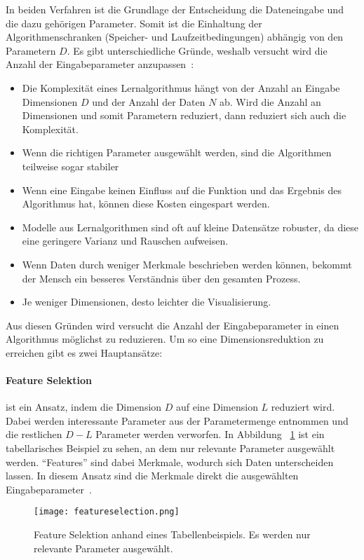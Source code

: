 In beiden Verfahren ist die Grundlage der Entscheidung die Dateneingabe und die dazu gehörigen Parameter. Somit ist die Einhaltung der Algorithmenschranken (Speicher- und Laufzeitbedingungen) abhängig von den Parametern $D$. Es gibt unterschiedliche Gründe, weshalb versucht wird die Anzahl der Eingabeparameter anzupassen~\cite{alpaydin2014introduction}:
\begin{itemize}
  \setlength{\itemsep}{3pt}
  \renewcommand\labelitemi{\textbullet}
  \item Die Komplexität eines Lernalgorithmus hängt von der Anzahl an Eingabe Dimensionen $D$ und der Anzahl der Daten $N$ ab. Wird die Anzahl an Dimensionen und somit Parametern reduziert, dann reduziert sich auch die Komplexität.
  \item Wenn die richtigen Parameter ausgewählt werden, sind die Algorithmen teilweise sogar stabiler~\cite{morchen2003time}
  \item Wenn eine Eingabe keinen Einfluss auf die Funktion und das Ergebnis des Algorithmus hat, können diese Kosten eingespart werden.
  \item Modelle aus Lernalgorithmen sind oft auf kleine Datensätze robuster, da diese eine geringere Varianz und Rauschen aufweisen.
  \item Wenn Daten durch weniger Merkmale beschrieben werden können, bekommt der Mensch ein besseres Verständnis über den gesamten Prozess.
  \item Je weniger Dimensionen, desto leichter die Visualisierung.
\end{itemize}

Aus diesen Gründen wird versucht die Anzahl der Eingabeparameter in einen Algorithmus möglichst zu reduzieren. Um so eine Dimensionsreduktion zu erreichen gibt es zwei Hauptansätze:
\paragraph{Feature Selektion} ist ein Ansatz, indem die Dimension $D$ auf eine Dimension $L$ reduziert wird. Dabei werden interessante Parameter aus der Parametermenge entnommen und die restlichen $D-L$ Parameter werden verworfen.
In Abbildung \ \ref{fig:featureselection} ist ein tabellarisches Beispiel zu sehen, an dem nur relevante Parameter ausgewählt werden.
\enquote{Features} sind dabei Merkmale, wodurch sich Daten unterscheiden lassen. In diesem Ansatz sind die Merkmale direkt die ausgewählten Eingabeparameter~\cite{alpaydin2014introduction}.

\begin{figure}
  \centering
  \texttt{[image: featureselection.png]}
  \caption{Feature Selektion anhand eines Tabellenbeispiels. Es werden nur relevante Parameter ausgewählt.}
  \label{fig:featureselection}
\end{figure}


